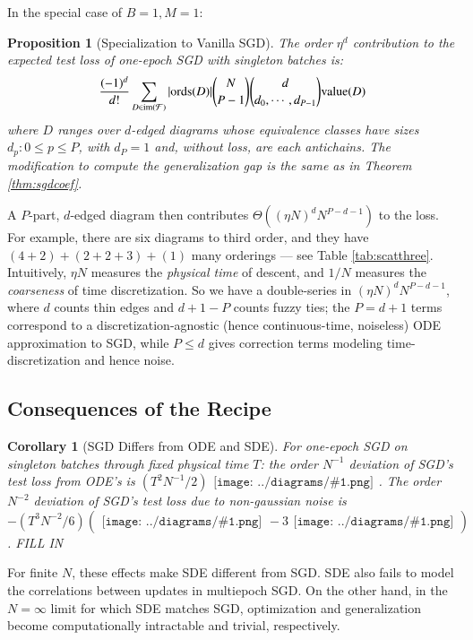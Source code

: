 \documentclass{article}
\newtheorem{cor}{Corollary}
\newtheorem{prop}{Proposition}
\newcommand{\Free}{\mathcal{F}}
\newcommand{\image}{\text{\textnormal{im}}}
\newcommand{\dvalue}{\text{\textnormal{value}}}
\newcommand{\ords}{\text{\textnormal{ords}}}
\newcommand{\sdia}[1]{\begin{gathered}\texttt{[image: ../diagrams/\#1.png]}\end{gathered}}
\begin{document}
        In the special case of $B=1, M=1$:
        \begin{prop}[Specialization to Vanilla SGD] \label{prop:vanilla}
            The order $\eta^d$ contribution to the expected test loss of
            one-epoch SGD with singleton batches is:
            \begin{equation}\label{eq:sgdbasiccoef}
                \frac{(-1)^d}{d!} \sum_{D\in \image(\Free)} 
                |\ords(D)| {N \choose P-1} {d \choose d_0,\cdots,d_{P-1}}
                \dvalue(D)
            \end{equation}
            where $D$ ranges over $d$-edged diagrams whose equivalence classes
            have sizes $d_p: 0\leq p\leq P$, with $d_P=1$
            and, without loss, are each antichains.  The modification to
            compute the generalization gap is the same as in Theorem
            \ref{thm:sgdcoef}.
        \end{prop}
        A $P$-part, $d$-edged diagram then contributes $\Theta\left((\eta N)^d
        N^{P-d-1}\right)$ to the loss.  For example, there are six diagrams to
        third order, and they have $(4+2)+(2+2+3)+(1)$ many orderings --- see
        Table \ref{tab:scatthree}.  Intuitively, $\eta N$ measures the \emph{
        physical time} of descent, and $1/N$ measures the \emph{coarseness} of
    time discretization.  So we have a double-series in $(\eta N)^d N^{P-d-1}$,
    where $d$ counts thin edges and $d+1-P$ counts fuzzy ties; the $P=d+1$
    terms correspond to a discretization-agnostic (hence continuous-time,
    noiseless) ODE approximation to SGD, while $P\leq d$ gives correction terms
    modeling time-discretization and hence noise.  


    \subsection{Consequences of the Recipe}

        \begin{cor}[SGD Differs from ODE and SDE] \label{cor:vsode}
            For one-epoch SGD on singleton batches through fixed physical time
            $T$: the order $N^{-1}$ deviation of SGD's test loss from ODE's is
            $
                ({{T^2 N^{-1}}/{2}}) \sdia{c(01-2)(02-12)}
            $.
            The order $N^{-2}$ deviation of SGD's test loss due to non-gaussian
            noise is
            $
                -({{T^3 N^{-2}}/{6}}) (\sdia{c(012-3)(03-13-23)} - 3 \sdia{c(01-2-3)(03-13-23)})
            $.
            {\color{moor} FILL IN}
        \end{cor}
        For finite $N$, these effects make SDE different from SGD.  SDE also
        fails to model the correlations between updates in multiepoch SGD.  On
        the other hand, in the $N=\infty$ limit for which SDE matches SGD,
        optimization and generalization become computationally intractable and
        trivial, respectively. 
    
\end{document}
